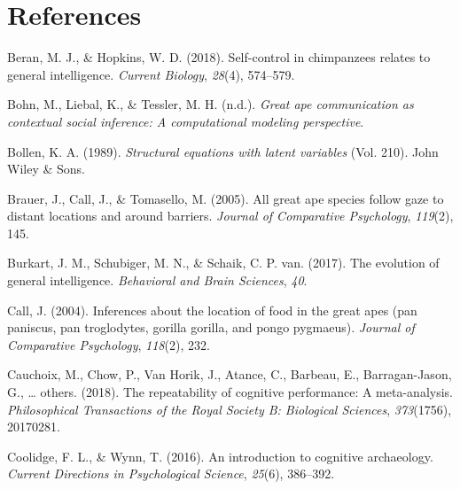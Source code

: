 \documentclass[
  man,floatsintext]{apa6}
\newlength{\cslhangindent}
\newlength{\cslentryspacingunit} %
\newenvironment{CSLReferences}[2] %
 {%
  \setlength{\parindent}{0pt}
  \ifodd #1
  \let\oldpar\par
  \def\par{\hangindent=\cslhangindent\oldpar}
  \fi
  \setlength{\parskip}{#2\cslentryspacingunit}
 }%
 {}
\begin{document}
\hypertarget{references}{%
\section{References}\label{references}}

\begingroup
\setlength{\parindent}{-0.5in}
\setlength{\leftskip}{0.5in}

\hypertarget{refs}{}
\begin{CSLReferences}{1}{0}
\leavevmode{}%
Beran, M. J., \& Hopkins, W. D. (2018). Self-control in chimpanzees relates to general intelligence. \emph{Current Biology}, \emph{28}(4), 574--579.

\leavevmode{}%
Bohn, M., Liebal, K., \& Tessler, M. H. (n.d.). \emph{Great ape communication as contextual social inference: A computational modeling perspective}.

\leavevmode{}%
Bollen, K. A. (1989). \emph{Structural equations with latent variables} (Vol. 210). John Wiley \& Sons.

\leavevmode{}%
Brauer, J., Call, J., \& Tomasello, M. (2005). All great ape species follow gaze to distant locations and around barriers. \emph{Journal of Comparative Psychology}, \emph{119}(2), 145.

\leavevmode{}%
Burkart, J. M., Schubiger, M. N., \& Schaik, C. P. van. (2017). The evolution of general intelligence. \emph{Behavioral and Brain Sciences}, \emph{40}.

\leavevmode{}%
Call, J. (2004). Inferences about the location of food in the great apes (pan paniscus, pan troglodytes, gorilla gorilla, and pongo pygmaeus). \emph{Journal of Comparative Psychology}, \emph{118}(2), 232.

\leavevmode{}%
Cauchoix, M., Chow, P., Van Horik, J., Atance, C., Barbeau, E., Barragan-Jason, G., \ldots{} others. (2018). The repeatability of cognitive performance: A meta-analysis. \emph{Philosophical Transactions of the Royal Society B: Biological Sciences}, \emph{373}(1756), 20170281.

\leavevmode{}%
Coolidge, F. L., \& Wynn, T. (2016). An introduction to cognitive archaeology. \emph{Current Directions in Psychological Science}, \emph{25}(6), 386--392.


\end{CSLReferences}
\end{document}
